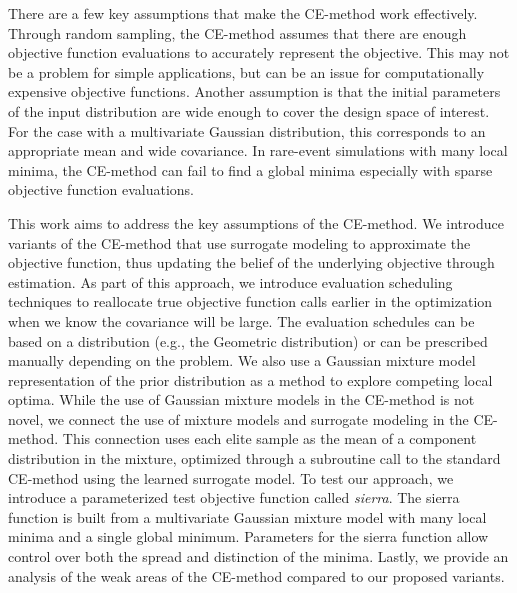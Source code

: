 There are a few key assumptions that make the CE-method work effectively.
Through random sampling, the CE-method assumes that there are enough objective function evaluations to accurately represent the objective. 
This may not be a problem for simple applications, but can be an issue for computationally expensive objective functions. 
Another assumption is that the initial parameters of the input distribution are wide enough to cover the design space of interest. For the case with a multivariate Gaussian distribution, this corresponds to an appropriate mean and wide covariance.
In rare-event simulations with many local minima, the CE-method can fail to find a global minima especially with sparse objective function evaluations.

This work aims to address the key assumptions of the CE-method.
We introduce variants of the CE-method that use surrogate modeling to approximate the objective function, thus updating the belief of the underlying objective through estimation.
As part of this approach, we introduce evaluation scheduling techniques to reallocate true objective function calls earlier in the optimization when we know the covariance will be large.
The evaluation schedules can be based on a distribution (e.g., the Geometric distribution) or can be prescribed manually depending on the problem.
We also use a Gaussian mixture model representation of the prior distribution as a method to explore competing local optima.
While the use of Gaussian mixture models in the CE-method is not novel, we connect the use of mixture models and surrogate modeling in the CE-method.
This connection uses each elite sample as the mean of a component distribution in the mixture, optimized through a subroutine call to the standard CE-method using the learned surrogate model.
To test our approach, we introduce a parameterized test objective function called \textit{sierra}.
The sierra function is built from a multivariate Gaussian mixture model with many local minima and a single global minimum.
Parameters for the sierra function allow control over both the spread and distinction of the minima.
Lastly, we provide an analysis of the weak areas of the CE-method compared to our proposed variants.


